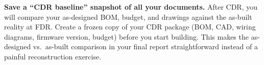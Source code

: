 \begin{tipbox}
\textbf{Save a ``CDR baseline'' snapshot of all your documents.} After CDR, you will compare your as-designed BOM, budget, and drawings against the as-built reality at FDR. Create a frozen copy of your CDR package (BOM, CAD, wiring diagrams, firmware version, budget) before you start building. This makes the as-designed vs.\ as-built comparison in your final report straightforward instead of a painful reconstruction exercise.
\end{tipbox}

